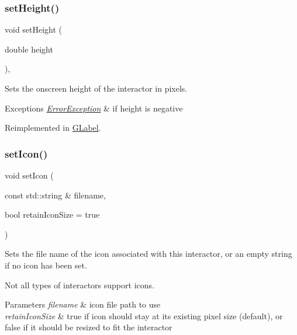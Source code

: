 \subsubsection{\texorpdfstring{set\+Height()}{setHeight()}}
{\footnotesize\ttfamily void set\+Height (\begin{DoxyParamCaption}\item[{double}]{height }\end{DoxyParamCaption})\hspace{0.3cm}{\ttfamily [virtual]}, {\ttfamily [inherited]}}



Sets the onscreen height of the interactor in pixels. 


\begin{DoxyExceptions}{Exceptions}
{\em \mbox{\hyperlink{classErrorException}{Error\+Exception}}} & if height is negative \\
\hline
\end{DoxyExceptions}


Reimplemented in \mbox{\hyperlink{classGLabel_a8a1f6693796b536d1ace7ce0ff66afee}{G\+Label}}.

\mbox{\label{classGButton_a75753a3d7d3364185f8088d63b664cb1}} 
\subsubsection{\texorpdfstring{set\+Icon()}{setIcon()}}
{\footnotesize\ttfamily void set\+Icon (\begin{DoxyParamCaption}\item[{const std\+::string \&}]{filename,  }\item[{bool}]{retain\+Icon\+Size = {\ttfamily true} }\end{DoxyParamCaption})\hspace{0.3cm}{\ttfamily [virtual]}}



Sets the file name of the icon associated with this interactor, or an empty string if no icon has been set. 

Not all types of interactors support icons. 
\begin{DoxyParams}{Parameters}
{\em filename} & icon file path to use \\
\hline
{\em retain\+Icon\+Size} & true if icon should stay at its existing pixel size (default), or false if it should be resized to fit the interactor \\
\hline
\end{DoxyParams}


